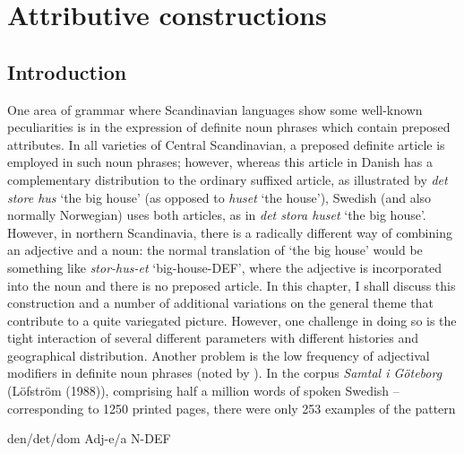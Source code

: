 \chapter[Attributive constructions]{\rmfamily\bfseries Attributive constructions}
\section{\rmfamily\bfseries Introduction}
\label{bkm:Ref262028996}
\begin{styleBodytextC}
One area of grammar where Scandinavian languages show some well-known peculiarities is in the expression of definite noun phrases which contain preposed attributes. In all varieties of Central Scandinavian, a preposed definite article is employed in such noun phrases; however, whereas this article in Danish has a complementary distribution to the ordinary suffixed article, as illustrated by \textit{det store hus} ‘the big house’ (as opposed to \textit{huset} ‘the house’), Swedish (and also normally Norwegian) uses both articles, as in \textit{det stora huset} ‘the big house’. However, in northern Scandinavia, there is a radically different way of combining an adjective and a noun: the normal translation of ‘the big house’ would be something like \textit{stor-hus-et} ‘big-house-DEF’, where the adjective is incorporated into the noun and there is no preposed article. In this chapter, I shall discuss this construction and a number of additional variations on the general theme that contribute to a quite variegated picture. However, one challenge in doing so is the tight interaction of several different parameters with different histories and geographical distribution. Another problem is the low frequency of adjectival modifiers in definite noun phrases (noted by \citet{Thompson1988}). In the corpus \textit{Samtal i Göteborg }(Löfström (1988)), comprising half a million words of spoken Swedish – corresponding to 1250 printed pages, there were only 253 examples of the pattern

\end{styleBodytextC}

\begin{listWWNumileveli}
\item 

\begin{styleExample}
den/det/dom Adj-e/a N-DEF

\end{styleExample}

\end{listWWNumileveli}

